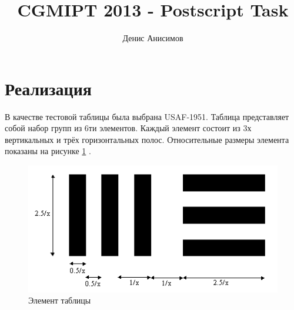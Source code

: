 \documentclass[12pt]{article}
\title{CGMIPT 2013 - Postscript Task}
\author{Денис Анисимов}
\date{}
\begin{document}
\maketitle
\section*{Реализация}
В качестве тестовой таблицы была выбрана USAF-1951. Таблица представляет собой набор групп из 6ти элементов. Каждый элемент состоит из 3х вертикальных и трёх горизонтальных полос. Относительные размеры элемента показаны на рисунке \ref{fig:elem} .

\begin{figure}[!h]
  \begin{center}
  \includegraphics[scale=0.5]{USAFTestElementSpec.png}  
  \end{center}
  \caption[Элемент таблицы]{Элемент таблицы\protect\footnotemark}
  \label{fig:elem}
\end{figure}
\end{document}
